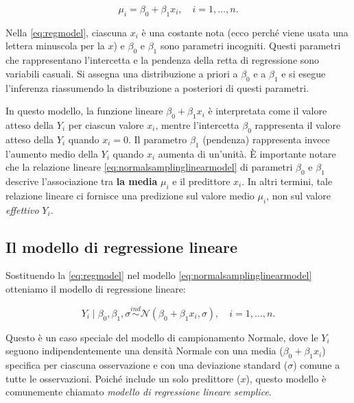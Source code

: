 \documentclass[
]{memoir}
\begin{document}
\begin{equation}
\mu_i = \beta_0 + \beta_ 1 x_i, \quad i = 1, \dots, n.
\label{eq:regmodel}
\end{equation}

Nella \eqref{eq:regmodel}, ciascuna \(x_i\) è una costante nota (ecco perché viene usata una lettera minuscola per la \(x\)) e \(\beta_0\) e \(\beta_ 1\) sono parametri incogniti. Questi parametri che rappresentano l'intercetta e la pendenza della retta di regressione sono variabili casuali. Si assegna una distribuzione a priori a \(\beta_0\) e a \(\beta_ 1\) e si esegue l'inferenza riassumendo la distribuzione a posteriori di questi parametri.

In questo modello, la funzione lineare \(\beta_0 + \beta_ 1 x_i\) è interpretata come il valore atteso della \(Y_i\) per ciascun valore \(x_i\), mentre l'intercetta \(\beta_0\) rappresenta il valore atteso della \(Y_i\) quando \(x_i = 0\). Il parametro \(\beta_ 1\) (pendenza) rappresenta invece l'aumento medio della \(Y_i\) quando \(x_i\) aumenta di un'unità. È importante notare che la relazione lineare \eqref{eq:normalsamplinglinearmodel} di parametri \(\beta_0\) e \(\beta_ 1\) descrive l'associazione tra \textbf{la media} \(\mu_i\) e il predittore \(x_i\). In altri termini, tale relazione lineare ci fornisce una predizione sul valore medio \(\mu_i\), non sul valore \emph{effettivo} \(Y_i\).

\hypertarget{il-modello-di-regressione-lineare}{%
\subsection{Il modello di regressione lineare}\label{il-modello-di-regressione-lineare}}

Sostituendo la \eqref{eq:regmodel} nel modello \eqref{eq:normalsamplinglinearmodel} otteniamo il modello di regressione lineare:

\begin{equation}
Y_i \mid \beta_0, \beta_ 1, \sigma \stackrel{ind}{\sim} \mathcal{N}(\beta_0 + \beta_ 1 x_i, \sigma), \quad i = 1, \dots, n.
\label{eq:samplinglinearmodel}
\end{equation}

Questo è un caso speciale del modello di campionamento Normale, dove le \(Y_i\) seguono indipendentemente una densità Normale con una media (\(\beta_0 + \beta_ 1 x_i\)) specifica per ciascuna osservazione e con una deviazione standard (\(\sigma\)) comune a tutte le osservazioni. Poiché include un solo predittore (\(x\)), questo modello è comunemente chiamato \emph{modello di regressione lineare semplice}.
\end{document}
